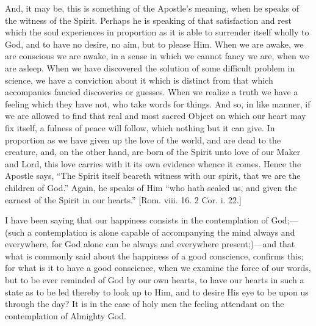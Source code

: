 And, it may be, this is something of the Apostle's meaning, when he
speaks of the witness of the Spirit. Perhaps he is speaking of that
satisfaction and rest which the soul experiences in proportion as it
is able to surrender itself wholly to God, and to have no desire, no
aim, but to please Him. When we are awake, we are conscious we are
awake, in a sense in which we cannot fancy we are, when we are asleep.
When we have discovered the solution of some difficult problem in
science, we have a conviction about it which is distinct from that
which accompanies fancied discoveries or guesses. When we realize a
truth we have a feeling which they have not, who take words for
things. And so, in like manner, if we are allowed to find that real
and most sacred Object on which our heart may fix itself, a fulness of
peace will follow, which nothing but it can give. In proportion as we
have given up the love of the world, and are dead to the creature,
and, on the other hand, are born of the Spirit unto love of our Maker
and Lord, this love carries with it its own evidence whence it comes.
Hence the Apostle says, ``The Spirit itself beareth witness with
our spirit, that we are the children of God.'' Again, he speaks of
Him ``who hath sealed us, and given the earnest of the Spirit in
our hearts.'' [Rom. viii. 16. 2 Cor. i. 22.]

I have been saying that our happiness consists in the contemplation
of God;—(such a contemplation is alone capable of accompanying the
mind always and everywhere, for God alone can be always and everywhere
present;)—and that what is commonly said about the happiness of a
good conscience, confirms this; for what is it to have a good
conscience, when we examine the force of our words, but to be ever
reminded of God by our own hearts, to have our hearts in such a state
as to be led thereby to look up to Him, and to desire His eye to be
upon us through the day? It is in the case of holy men the feeling
attendant on the contemplation of Almighty God.


